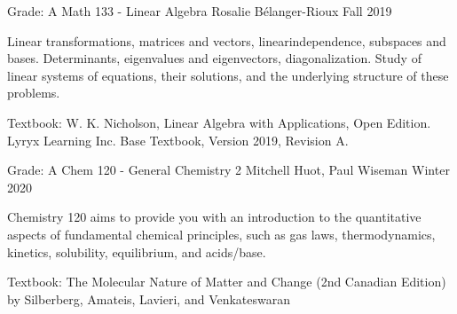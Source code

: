 \begin{cventries}
    \cventry
    {Grade: A} %
    {Math 133 - Linear Algebra} %
    {Rosalie Bélanger-Rioux} %
    {Fall 2019} %
    {
      \begin{cvitems} %
      \item {Linear transformations, matrices and vectors, linearindependence, subspaces and bases. Determinants, eigenvalues and eigenvectors, diagonalization. Study of linear systems of equations, their solutions, and the underlying structure of these problems.}
      \item {Textbook: W. K. Nicholson, Linear Algebra with Applications, Open Edition. Lyryx Learning Inc. Base Textbook, Version 2019, Revision A.}
      \end{cvitems}
    }

\end{cventries}


\begin{cventries}
    \cventry
    {Grade: A} %
    {Chem 120 - General Chemistry 2} %
    {Mitchell Huot, Paul Wiseman} %
    {Winter 2020} %
    {
      \begin{cvitems} %
      \item {Chemistry 120 aims to provide you with an introduction to the quantitative aspects of fundamental chemical principles, such as gas laws, thermodynamics, kinetics, solubility, equilibrium, and acids/base.}
      \item {Textbook: The Molecular Nature of Matter and Change (2nd Canadian Edition) by Silberberg, Amateis, Lavieri, and Venkateswaran}
      \end{cvitems}
    }

\end{cventries}



